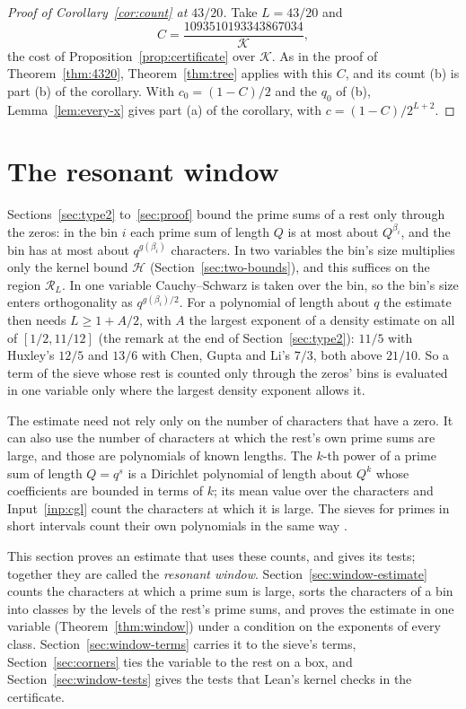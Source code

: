 \documentclass[11pt]{article}
\theoremstyle{definition}
\begin{document}
\begin{proof}[Proof of Corollary~\ref{cor:count} at $43/20$]
Take $L = 43/20$ and
\[
  C = \frac{1093510193343867034}{\mathcal K},
\]
the cost of Proposition~\ref{prop:certificate} over $\mathcal K$. As in the proof of Theorem~\ref{thm:4320},
Theorem~\ref{thm:tree} applies with this $C$, and its count (b) is part (b) of the corollary. With $c_0 = (1 - C)/2$
and the $q_0$ of (b), Lemma~\ref{lem:every-x} gives part (a) of the corollary, with $c = (1 - C)/2^{L + 2}$.
\end{proof}

\section{The resonant window}\label{sec:window}

Sections~\ref{sec:type2} to~\ref{sec:proof} bound the prime sums of a rest only through the zeros: in the bin $i$ each
prime sum of length $Q$ is at most about $Q^{\beta_i}$, and the bin has at most about $q^{g(\beta_i)}$ characters. In
two variables the bin's size multiplies only the kernel bound $\mathcal H$ (Section~\ref{sec:two-bounds}), and this
suffices on the region $\mathcal R_L$. In one variable Cauchy--Schwarz is taken over the bin, so the bin's size enters
orthogonality as $q^{g(\beta_i)/2}$. For a polynomial of length about $q$ the estimate then needs $L \ge 1 + A/2$,
with $A$ the largest
exponent of a density estimate on all of $[1/2, 11/12]$ (the remark at the end of Section~\ref{sec:type2}): $11/5$
with Huxley's $12/5$ and $13/6$ with Chen, Gupta and Li's $7/3$, both above $21/10$. So a term of the sieve whose rest
is counted only through the zeros' bins is evaluated in one variable only where the largest density exponent allows it.

The estimate need not rely only on the number of characters that have a zero. It can also use the number of
characters at which the rest's own prime sums are large, and those are polynomials of known lengths. The $k$-th power
of a prime sum of length
$Q = q^s$ is a Dirichlet polynomial of length about $Q^k$ whose coefficients are bounded in terms of $k$; its mean
value over the characters and Input~\ref{inp:cgl} count the characters at which it is large. The sieves for primes in
short intervals count their own polynomials in the same way \cite{hb-iwaniec, bhp, harman}.

This section proves an estimate that uses these counts, and gives its tests; together they are called the
\emph{resonant window}. Section~\ref{sec:window-estimate} counts the characters at which a prime sum is large, sorts
the characters of a bin into classes by the levels of the rest's prime sums, and proves the estimate in one variable
(Theorem~\ref{thm:window}) under a condition on the exponents of every class.
Section~\ref{sec:window-terms} carries it to the sieve's terms, Section~\ref{sec:corners} ties the variable to the
rest on a box, and Section~\ref{sec:window-tests} gives the tests that Lean's kernel checks in the certificate.
\end{document}
